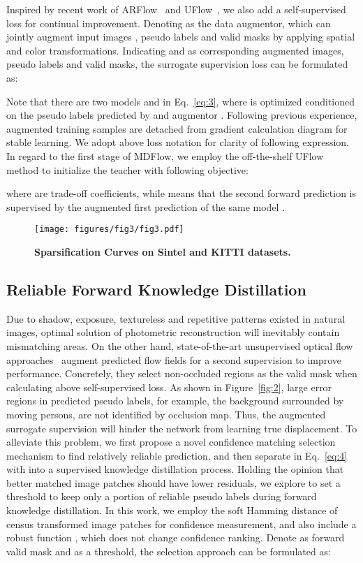 \documentclass[lettersize,journal]{IEEEtran}
\begin{document}
Inspired by recent work of ARFlow~\cite{Liu_2020_CVPR} and UFlow~\cite{10.1007/978-3-030-58536-5_33}, we also add a self-supervised loss for continual improvement. Denoting  as the data augmentor, which can jointly augment input images , pseudo labels  and valid masks  by applying spatial and color transformations. Indicating  and  as corresponding augmented images, pseudo labels and valid masks, the surrogate supervision loss can be formulated as:

Note that there are two models  and  in Eq.~\ref{eq:3}, where  is optimized conditioned on the pseudo labels  predicted by  and augmentor . Following previous experience, augmented training samples are detached from gradient calculation diagram for stable learning. We adopt above loss notation for clarity of following expression. In regard to the first stage of MDFlow, we employ the off-the-shelf UFlow~\cite{10.1007/978-3-030-58536-5_33} method to initialize the teacher  with following objective:

where  are trade-off coefficients, while  means that the second forward prediction is supervised by the augmented first prediction of the same model .

\begin{figure}[t]
	\centering
	\texttt{[image: figures/fig3/fig3.pdf]}
	\caption{\textbf{Sparsification Curves on Sintel and KITTI datasets.}}
	\label{fig:3}
\end{figure}

\subsection{Reliable Forward Knowledge Distillation}
Due to shadow, exposure, textureless and repetitive patterns existed in natural images, optimal solution of photometric reconstruction will inevitably contain mismatching areas. On the other hand, state-of-the-art unsupervised optical flow approaches~\cite{Liu_2020_CVPR,10.1007/978-3-030-58536-5_33} augment predicted flow fields for a second supervision to improve performance. Concretely, they select non-occluded regions as the valid mask when calculating above self-supervised loss. As shown in Figure~\ref{fig:2}, large error regions in predicted pseudo labels, for example, the background surrounded by moving persons, are not identified by occlusion map. Thus, the augmented surrogate supervision will hinder the network from learning true displacement. To alleviate this problem, we first propose a novel confidence matching selection mechanism to find relatively reliable prediction, and then separate  in Eq.~\ref{eq:4} with  into a supervised knowledge distillation process. Holding the opinion that better matched image patches should have lower residuals, we explore to set a threshold to keep only a portion of reliable pseudo labels during forward knowledge distillation. In this work, we employ the soft Hamming distance of census transformed image patches for confidence measurement, and also include a robust function , which does not change confidence ranking. Denote  as forward valid mask and  as a threshold, the selection approach can be formulated as:
\end{document}
